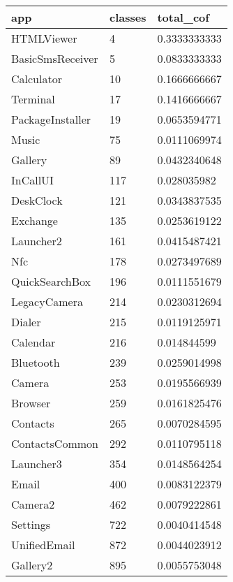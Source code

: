\begin{tabular}{|l|l|l|}
\hline
app&classes&total\_cof\\
\hline
HTMLViewer&4&0.3333333333\\
\hline
BasicSmsReceiver&5&0.0833333333\\
\hline
Calculator&10&0.1666666667\\
\hline
Terminal&17&0.1416666667\\
\hline
PackageInstaller&19&0.0653594771\\
\hline
Music&75&0.0111069974\\
\hline
Gallery&89&0.0432340648\\
\hline
InCallUI&117&0.028035982\\
\hline
DeskClock&121&0.0343837535\\
\hline
Exchange&135&0.0253619122\\
\hline
Launcher2&161&0.0415487421\\
\hline
Nfc&178&0.0273497689\\
\hline
QuickSearchBox&196&0.0111551679\\
\hline
LegacyCamera&214&0.0230312694\\
\hline
Dialer&215&0.0119125971\\
\hline
Calendar&216&0.014844599\\
\hline
Bluetooth&239&0.0259014998\\
\hline
Camera&253&0.0195566939\\
\hline
Browser&259&0.0161825476\\
\hline
Contacts&265&0.0070284595\\
\hline
ContactsCommon&292&0.0110795118\\
\hline
Launcher3&354&0.0148564254\\
\hline
Email&400&0.0083122379\\
\hline
Camera2&462&0.0079222861\\
\hline
Settings&722&0.0040414548\\
\hline
UnifiedEmail&872&0.0044023912\\
\hline
Gallery2&895&0.0055753048\\
\hline
\end{tabular}
